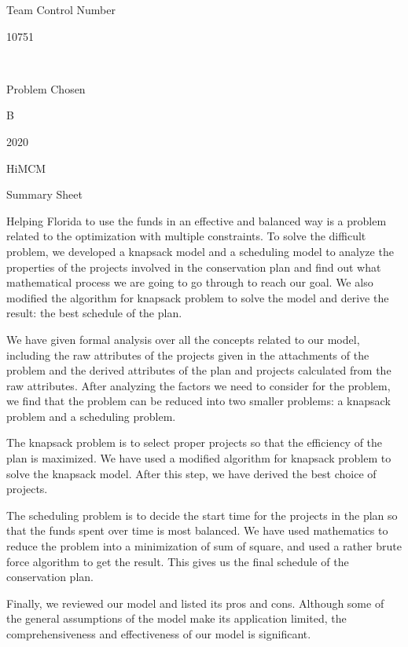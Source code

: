 \documentclass{article}
\begin{document}
\begin{center}
Team Control Number

\Huge 10751

\normalsize ~

Problem Chosen

\Huge B

\Large 2020

HiMCM

Summary Sheet
\end{center}

\normalsize

Helping Florida to use the funds in an effective and balanced way is a problem related to the optimization with multiple constraints.
To solve the difficult problem, we developed a knapsack model and a scheduling model to analyze the properties of the projects involved in the conservation plan and find out what mathematical process we are going to go through to reach our goal.
We also modified the algorithm for knapsack problem to solve the model and derive the result: the best schedule of the plan.

We have given formal analysis over all the concepts related to our model,
including the raw attributes of the projects given in the attachments of the problem
and the derived attributes of the plan and projects calculated from the raw attributes.
After analyzing the factors we need to consider for the problem, we find that the problem can be reduced into two smaller problems: a knapsack problem and a scheduling problem.

The knapsack problem is to select proper projects so that the efficiency of the plan is maximized.
We have used a modified algorithm for knapsack problem to solve the knapsack model.
After this step, we have derived the best choice of projects.

The scheduling problem is to decide the start time for the projects in the plan so that the funds spent over time is most balanced.
We have used mathematics to reduce the problem into a minimization of sum of square, and used a rather brute force algorithm to get the result.
This gives us the final schedule of the conservation plan.

Finally, we reviewed our model and listed its pros and cons.
Although some of the general assumptions of the model make its application limited,
the comprehensiveness and effectiveness of our model is significant.

\newpage

\tableofcontents
\end{document}
